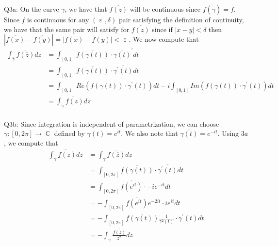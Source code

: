 \documentclass[letterpaper]{article}
\DeclareMathOperator{\C}{\mathbb{C}}
\DeclareMathOperator{\ep}{\varepsilon}
\newcommand{\ol}{\overline}
\begin{document}
\noindent
Q3a: On the curve $\ol{\gamma}$, we have that $\ol{f(\ol{z})}$ will be continuous since $\ol{f(\ol{\ol{\gamma}})} = \ol{f}$. Since $f$ is continuous for any $(\ep,\delta)$ pair satisfying the definition of continuity, we have that the same pair will satisfy for $\ol{f(z)}$ since if $|x-y| <\delta$ then $|\ol{f(x)} - \ol{f(y)}| = |f(x)- f(y) |<\ep$. We now compute that 
\begin{align*}
    \int_{\ol{\gamma}} \ol{f(\ol{z})} dz & = \int_{[0,1]} \ol{f(\gamma(t))} \cdot  \ol{\gamma(t)}^\prime dt 
    \\ & = \int_{[0,1]} \ol{f(\gamma(t))} \cdot \ol{\gamma^\prime(t)} dt \tag{since $\gamma$ is a function of real variable}
    \\ & = \int_{[0,1]} Re(f(\gamma(t)) \cdot \gamma^\prime(t)) dt - i \int_{[0,1]} Im(f(\gamma(t))\cdot \gamma^\prime(t)) dt 
    \\ & = \ol{\int_{\gamma} f(z)dz} \tag{by definition}
\end{align*} 
\newline \\ Q3b: Since integration is independent of parametrization, we can choose $\gamma:[0,2\pi] \to \C$ defined by $\gamma(t) = e^{it}$. We also note that $\ol{\gamma(t)} = e^{-it} $. Using $3a$, we compute that 
\begin{align*}
    \ol{\int_\gamma f(z)dz} & = \int_{\ol{\gamma}} \ol{f(\ol{z})} dz
    \\ & = \int_{[0,2\pi]} \ol{f(\gamma(t))} \cdot \ol{\gamma^\prime(t)} dt 
    \\ & = \int_{[0,2 \pi]} \ol{f(e^{i t})} \cdot -i e^{-it} dt 
    \\ & = - \int_{[0,2 \pi]} \ol{f(e^{it})} e^{-2it} \cdot ie^{it} dt 
    \\ & = - \int_{[0,2\pi]} \ol{f(\gamma(t))} \frac{1}{\gamma^2(t)} \cdot \gamma^\prime(t) dt 
    \\ & = - \int_{\gamma} \frac{\ol{f(z)}}{z^2} dz
\end{align*}
\end{document}

